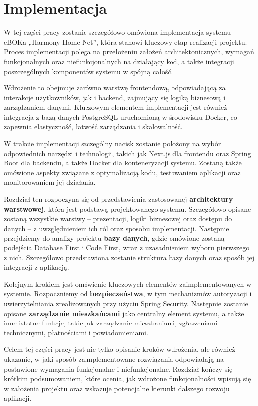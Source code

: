 \chapter{Implementacja}

W tej części pracy zostanie szczegółowo omówiona implementacja systemu eBOKa „Harmony Home Net”, która stanowi kluczowy etap realizacji projektu. Proces implementacji polega na przełożeniu założeń architektonicznych, wymagań funkcjonalnych oraz niefunkcjonalnych na działający kod, a także integracji poszczególnych komponentów systemu w spójną całość.

Wdrożenie to obejmuje zarówno warstwę frontendową, odpowiadającą za interakcje użytkowników, jak i backend, zajmujący się logiką biznesową i zarządzaniem danymi. Kluczowym elementem implementacji jest również integracja z bazą danych PostgreSQL uruchomioną w środowisku Docker, co zapewnia elastyczność, łatwość zarządzania i skalowalność.

W trakcie implementacji szczególny nacisk zostanie położony na wybór odpowiednich narzędzi i technologii, takich jak Next.js dla frontendu oraz Spring Boot dla backendu, a także Docker dla konteneryzacji systemu. Zostaną także omówione aspekty związane z optymalizacją kodu, testowaniem aplikacji oraz monitorowaniem jej działania.

Rozdział ten rozpoczyna się od przedstawienia zastosowanej \textbf{architektury warstwowej}, która jest podstawą projektowanego systemu. Szczegółowo opisane zostaną wszystkie warstwy – prezentacji, logiki biznesowej oraz dostępu do danych – z uwzględnieniem ich ról oraz sposobu implementacji. Następnie przejdziemy do analizy projektu \textbf{bazy danych}, gdzie omówione zostaną podejścia Database First i Code First, wraz z uzasadnieniem wyboru pierwszego z nich. Szczegółowo przedstawiona zostanie struktura bazy danych oraz sposób jej integracji z aplikacją.

Kolejnym krokiem jest omówienie kluczowych elementów zaimplementowanych w systemie. Rozpoczniemy od \textbf{bezpieczeństwa}, w tym mechanizmów autoryzacji i uwierzytelniania zrealizowanych przy użyciu Spring Security. Następnie zostanie opisane \textbf{zarządzanie mieszkańcami} jako centralny element systemu, a także inne istotne funkcje, takie jak zarządzanie mieszkaniami, zgłoszeniami technicznymi, płatnościami i powiadomieniami.

Celem tej części pracy jest nie tylko opisanie kroków wdrożenia, ale również ukazanie, w jaki sposób zaimplementowane rozwiązania odpowiadają na postawione wymagania funkcjonalne i niefunkcjonalne. Rozdział kończy się krótkim podsumowaniem, które ocenia, jak wdrożone funkcjonalności wpisują się w założenia projektu oraz wskazuje potencjalne kierunki dalszego rozwoju aplikacji.



